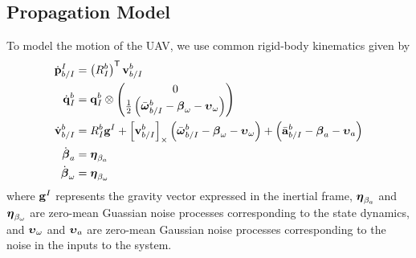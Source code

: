 
\subsection{Propagation Model}
To model the motion of the UAV, we use common rigid-body kinematics given by
\begin{align}
  \dot{\boldsymbol{\mathrm{p}}}_{b/I}^I
  &=
  \left( R_I^b \right)^{\mathsf{T}} \boldsymbol{\mathrm{v}}_{b/I}^b
  \label{eq:uav_dynamics}
  \\
  \dot{\boldsymbol{\mathrm{q}}}_{I}^{b} 
	&= 	
  \boldsymbol{\mathrm{q}}_I^b \otimes \begin{pmatrix} 0 \\ \frac{1}{2}
    \left( \bar{\boldsymbol{\mathrm{\omega}}}_{b/I}^b - \boldsymbol{\mathrm{\beta}}_\omega - \boldsymbol{\mathrm{\upsilon}}_\omega \right)
\end{pmatrix} \nonumber \\
  \dot{\boldsymbol{\mathrm{v}}}_{b/I}^b 
  &=
  R_I^b \boldsymbol{\mathrm{g}}^I
  +
  \left[ \boldsymbol{\mathrm{v}}_{b/I}^b \right]_{\times}
  \left( \bar{\boldsymbol{\mathrm{\omega}}}_{b/I}^b - \boldsymbol{\mathrm{\beta}}_\omega -
  \boldsymbol{\mathrm{\upsilon}}_\omega \right)
  +
  \left( \bar{\boldsymbol{\mathrm{a}}}_{b/I}^b - \boldsymbol{\mathrm{\beta}}_a - \boldsymbol{\mathrm{\upsilon}}_a \right) \nonumber
  \\
  \dot{\boldsymbol{\mathrm{\beta}}}_a &= \boldsymbol{\mathrm{\eta}}_{\beta_a} \nonumber
  \\
  \dot{\boldsymbol{\mathrm{\beta}}}_\omega &= \boldsymbol{\mathrm{\eta}}_{\beta_\omega} \nonumber
\end{align}
where $\boldsymbol{\mathrm{g}}^I$ represents the gravity vector expressed in the inertial
frame, $\boldsymbol{\mathrm{\eta}}_{\beta_a}$ and $\boldsymbol{\mathrm{\eta}}_{\beta_\omega}$ are zero-mean
Guassian noise processes corresponding to the state dynamics, and
$\boldsymbol{\mathrm{\upsilon}}_\omega$ and $\boldsymbol{\mathrm{\upsilon}}_a$ are zero-mean Gaussian noise
processes corresponding to the noise in the inputs to the system.

